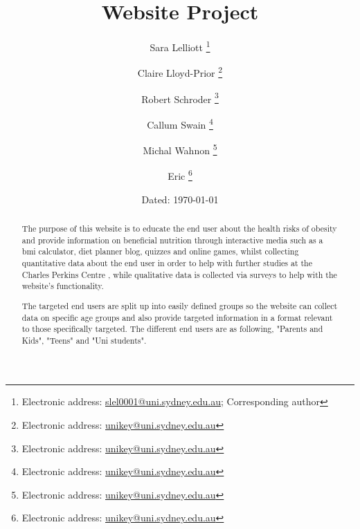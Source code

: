 \documentclass[letterpaper,12pt]{article}
\begin{document}

\author{Sara Lelliott%
  \thanks{Electronic address: \href{mailto:slel0001@uni.sydney.edu.au}{slel0001@uni.sydney.edu.au}; Corresponding author}}
\author{Claire Lloyd-Prior%
  \thanks{Electronic address: \href{mailto:unikey@uni.sydney.edu.au}{unikey@uni.sydney.edu.au}}}
\author{Robert Schroder%
  \thanks{Electronic address: \href{mailto:unikey@uni.sydney.edu.au}{unikey@uni.sydney.edu.au}}}
\author{Callum Swain%
  \thanks{Electronic address: \href{mailto:unikey@uni.sydney.edu.au}{unikey@uni.sydney.edu.au}}}
\author{Michal Wahnon%
  \thanks{Electronic address: \href{mailto:unikey@uni.sydney.edu.au}{unikey@uni.sydney.edu.au}}}
\author{Eric%
  \thanks{Electronic address: \href{mailto:unikey@uni.sydney.edu.au}{unikey@uni.sydney.edu.au}}}
\title{Website Project}
\date{Dated: \today}

\maketitle
\begin{abstract}
  The purpose of this website is to educate the end user about the health risks of obesity and provide information on beneficial nutrition through interactive media such as a \acrfull{bmi} calculator, diet planner blog, quizzes and online games, whilst collecting quantitative data about the end user in order to help with further studies at the Charles Perkins Centre , while qualitative data is collected via surveys to help with the website's functionality.

The targeted end users are split up into easily defined groups so the website can collect data on specific age groups and also provide targeted information in a format relevant to those specifically targeted. The different end users are as following, "Parents and Kids", "Teens" and "Uni students".
\end{abstract}
\newpage
\listoffigures
\newpage
\tableofcontents
\end{document}
